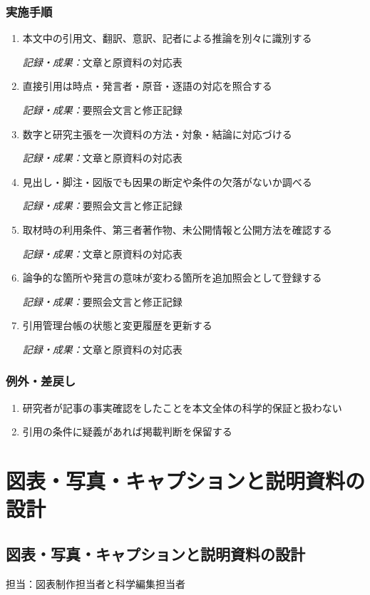 \documentclass[a4paper,11pt]{article}
\begin{document}
\subsubsection*{実施手順}
\begin{enumerate}[leftmargin=2em,itemsep=0.65em]
\item 本文中の引用文、翻訳、意訳、記者による推論を別々に識別する\par\noindent\textit{記録・成果：}文章と原資料の対応表\nobreak\smallskip
\item 直接引用は時点・発言者・原音・逐語の対応を照合する\par\noindent\textit{記録・成果：}要照会文言と修正記録\nobreak\smallskip
\item 数字と研究主張を一次資料の方法・対象・結論に対応づける\par\noindent\textit{記録・成果：}文章と原資料の対応表\nobreak\smallskip
\item 見出し・脚注・図版でも因果の断定や条件の欠落がないか調べる\par\noindent\textit{記録・成果：}要照会文言と修正記録\nobreak\smallskip
\item 取材時の利用条件、第三者著作物、未公開情報と公開方法を確認する\par\noindent\textit{記録・成果：}文章と原資料の対応表\nobreak\smallskip
\item 論争的な箇所や発言の意味が変わる箇所を追加照会として登録する\par\noindent\textit{記録・成果：}要照会文言と修正記録\nobreak\smallskip
\item 引用管理台帳の状態と変更履歴を更新する\par\noindent\textit{記録・成果：}文章と原資料の対応表\nobreak\smallskip
\end{enumerate}
\subsubsection*{例外・差戻し}
\begin{enumerate}[leftmargin=2em,itemsep=0.35em]
\item 研究者が記事の事実確認をしたことを本文全体の科学的保証と扱わない
\item 引用の条件に疑義があれば掲載判断を保留する
\end{enumerate}
\section{図表・写真・キャプションと説明資料の設計}
\subsection{図表・写真・キャプションと説明資料の設計}
\par 担当：図表制作担当者と科学編集担当者\par\medskip
\end{document}
